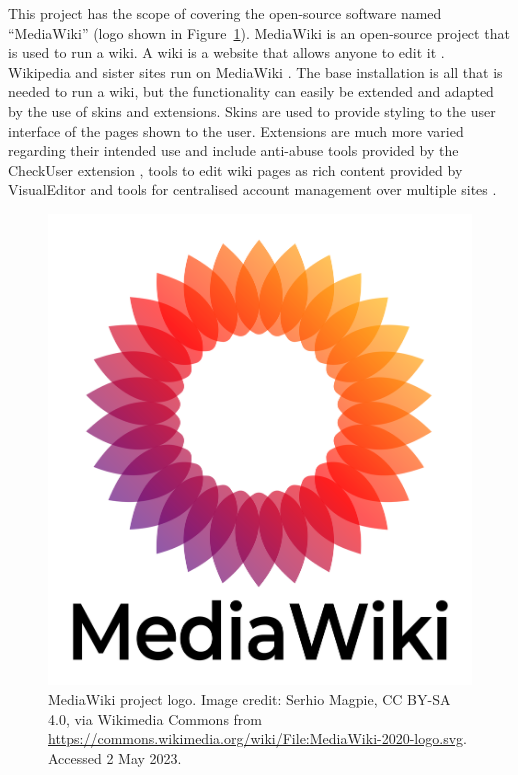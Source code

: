 This project has the scope of covering the open-source software named ``MediaWiki'' (logo shown in Figure~\ref{fig:mediawikilogo}). MediaWiki is an open-source project that is used to run a wiki. A wiki is a website that allows anyone to edit it \citep{collins-dictionary-definition-wiki}. Wikipedia and sister sites run on MediaWiki \citep{WhatIsMediaWiki}. The base installation is all that is needed to run a wiki, but the functionality can easily be extended and adapted by the use of skins and extensions. Skins are used to provide styling to the user interface of the pages shown to the user. Extensions are much more varied regarding their intended use  and include anti-abuse tools provided by the CheckUser extension , tools to edit wiki pages as rich content provided by VisualEditor  and tools for centralised account management over multiple sites .

\begin{figure}[htb]
    \centering
    \includegraphics[scale=0.035]{images/MediaWiki-2020-logo.svg.png}
    \caption[MediaWiki project logo.]{MediaWiki project logo. Image credit: Serhio Magpie, CC BY-SA 4.0, via Wikimedia Commons from \url{https://commons.wikimedia.org/wiki/File:MediaWiki-2020-logo.svg}. Accessed 2 May 2023.}
    \label{fig:mediawikilogo}
\end{figure}


